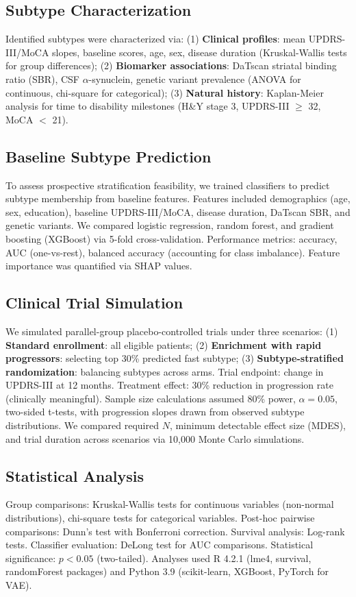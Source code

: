\subsection{Subtype Characterization}

Identified subtypes were characterized via: (1) \textbf{Clinical profiles}: mean UPDRS-III/MoCA slopes, baseline scores, age, sex, disease duration (Kruskal-Wallis tests for group differences); (2) \textbf{Biomarker associations}: DaTscan striatal binding ratio (SBR), CSF $\alpha$-synuclein, genetic variant prevalence (ANOVA for continuous, chi-square for categorical); (3) \textbf{Natural history}: Kaplan-Meier analysis for time to disability milestones (H\&Y stage 3, UPDRS-III $\geq$ 32, MoCA $<$ 21).

\subsection{Baseline Subtype Prediction}

To assess prospective stratification feasibility, we trained classifiers to predict subtype membership from baseline features. Features included demographics (age, sex, education), baseline UPDRS-III/MoCA, disease duration, DaTscan SBR, and genetic variants. We compared logistic regression, random forest, and gradient boosting (XGBoost)\cite{chen2016xgboost} via 5-fold cross-validation. Performance metrics: accuracy, AUC (one-vs-rest), balanced accuracy (accounting for class imbalance). Feature importance was quantified via SHAP values\cite{lundberg2017unified}.

\subsection{Clinical Trial Simulation}

We simulated parallel-group placebo-controlled trials under three scenarios: (1) \textbf{Standard enrollment}: all eligible patients; (2) \textbf{Enrichment with rapid progressors}: selecting top 30\% predicted fast subtype; (3) \textbf{Subtype-stratified randomization}: balancing subtypes across arms. Trial endpoint: change in UPDRS-III at 12 months. Treatment effect: 30\% reduction in progression rate (clinically meaningful\cite{olanow2009effect}). Sample size calculations assumed 80\% power, $\alpha=0.05$, two-sided t-tests, with progression slopes drawn from observed subtype distributions. We compared required $N$, minimum detectable effect size (MDES), and trial duration across scenarios via 10,000 Monte Carlo simulations.

\subsection{Statistical Analysis}

Group comparisons: Kruskal-Wallis tests for continuous variables (non-normal distributions), chi-square tests for categorical variables. Post-hoc pairwise comparisons: Dunn's test with Bonferroni correction. Survival analysis: Log-rank tests. Classifier evaluation: DeLong test for AUC comparisons. Statistical significance: $p < 0.05$ (two-tailed). Analyses used R 4.2.1 (lme4, survival, randomForest packages) and Python 3.9 (scikit-learn, XGBoost, PyTorch for VAE).
